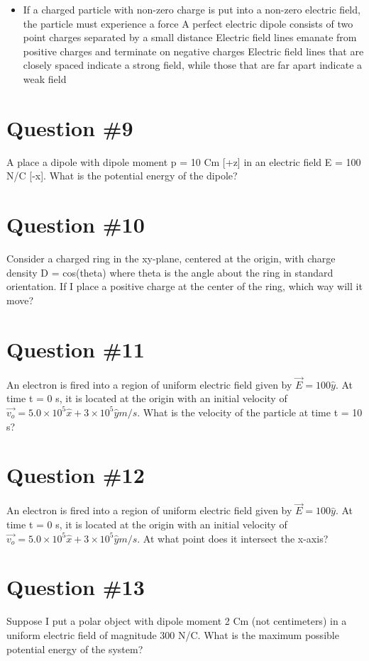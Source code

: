 \documentclass[12pt]{article}
\begin{document}
\begin{itemize}
\item If a charged particle with non-zero charge is put into a non-zero electric field, the particle must experience a force
 A perfect electric dipole consists of two point charges separated by a small distance
 Electric field lines emanate from positive charges and terminate on negative charges
 Electric field lines that are closely spaced indicate a strong field, while those that are far apart indicate a weak field
\end{itemize}

\section*{Question \#9}
A place a dipole with dipole moment p = 10 Cm [+z] in an electric field E = 100 N/C [-x].  What is the potential energy of the dipole?

\section*{Question \#10}
Consider a charged ring in the xy-plane, centered at the origin, with charge density D = cos(theta) where theta is the angle about the ring in standard orientation.  If I place a positive charge at the center of the ring, which way will it move?

\section*{Question \#11}
An electron is fired into a region of uniform electric field given by $\vec{E} = 100\hat{y}$. At time t = 0 s, it is located at the origin with an initial velocity of $\vec{v_o} = 5.0 \times 10^5 \hat{x} + 3 \times 10^5 \hat{y} m/s$.  What is the velocity of the particle at time t = 10 s?

\section*{Question \#12}
An electron is fired into a region of uniform electric field given by $\vec{E} = 100\hat{y}$. At time t = 0 s, it is located at the origin with an initial velocity of $\vec{v_o} = 5.0 \times 10^5 \hat{x} + 3 \times 10^5 \hat{y} m/s$.  At what point does it intersect the x-axis?

\section*{Question \#13}
Suppose I put a polar object with dipole moment 2 Cm (not centimeters) in a uniform electric field of magnitude 300 N/C.  What is the maximum possible potential energy of the system?
\end{document}
